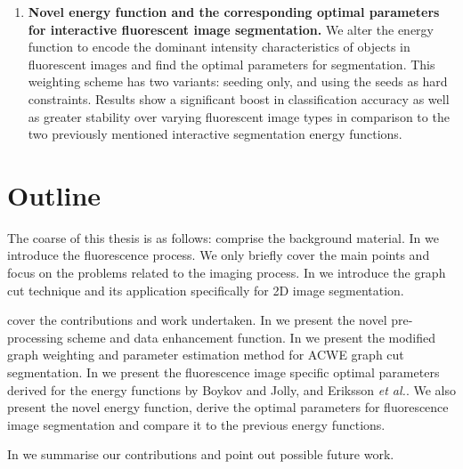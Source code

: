 \begin{enumerate}
	\item
	\textbf{Novel energy function and the corresponding optimal parameters for interactive fluorescent image segmentation.}
	We alter the energy function to encode the dominant intensity characteristics of objects in fluorescent images and find the optimal parameters for segmentation. This weighting scheme has two variants: seeding only, and using the seeds as hard constraints. Results show a significant boost in classification accuracy as well as greater stability over varying fluorescent image types in comparison to the two previously mentioned interactive segmentation energy functions. 
\end{enumerate}


\section{Outline}


The coarse of this thesis is as follows:
 comprise the background material.
In  we introduce the fluorescence process. We only briefly cover the main points  and focus on the problems related to the imaging process.
In  we introduce the graph cut technique and its application specifically for 2D image segmentation.

 cover the contributions and work undertaken.
In  we present the novel pre-processing scheme and data enhancement function.
In  we present the modified graph weighting and parameter estimation method for ACWE graph cut segmentation.
In  we present the fluorescence image specific optimal parameters derived for the energy functions by Boykov and Jolly, and Eriksson \textit{et al.}. We also present the novel energy function, derive the optimal parameters for fluorescence image segmentation and compare it to the previous energy functions.

In  we summarise our contributions and point out possible future work.